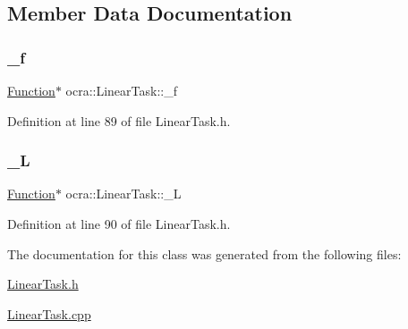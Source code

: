 \subsection{Member Data Documentation}
\hypertarget{classocra_1_1LinearTask_ab79a5c0caf93e7ecbc214ad40a8d2701}{}\label{classocra_1_1LinearTask_ab79a5c0caf93e7ecbc214ad40a8d2701} 
\subsubsection{\texorpdfstring{\+\_\+f}{\_f}}
{\footnotesize\ttfamily \hyperlink{classocra_1_1Function}{Function}$\ast$ ocra\+::\+Linear\+Task\+::\+\_\+f\hspace{0.3cm}{\ttfamily [protected]}}



Definition at line 89 of file Linear\+Task.\+h.

\hypertarget{classocra_1_1LinearTask_a9ce434a1d6641d486c20476b8f8a366d}{}\label{classocra_1_1LinearTask_a9ce434a1d6641d486c20476b8f8a366d} 
\subsubsection{\texorpdfstring{\+\_\+L}{\_L}}
{\footnotesize\ttfamily \hyperlink{classocra_1_1Function}{Function}$\ast$ ocra\+::\+Linear\+Task\+::\+\_\+L\hspace{0.3cm}{\ttfamily [protected]}}



Definition at line 90 of file Linear\+Task.\+h.



The documentation for this class was generated from the following files\+:\begin{DoxyCompactItemize}
\item 
\hyperlink{LinearTask_8h}{Linear\+Task.\+h}\item 
\hyperlink{LinearTask_8cpp}{Linear\+Task.\+cpp}\end{DoxyCompactItemize}
